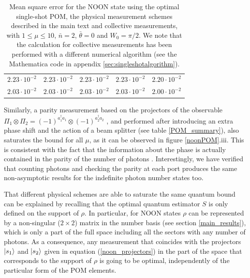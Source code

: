 \begin{table} [t]
{\begin{tabular}{|c|c|c|c|c|}
$2.23\cdot 10^{-2}$ & $2.23\cdot 10^{-2}$ & $2.23\cdot 10^{-2}$ & $2.23\cdot 10^{-2}$ & $2.20\cdot 10^{-2}$ \\
$2.03\cdot 10^{-2}$ & $2.03\cdot 10^{-2}$ & $2.03\cdot 10^{-2}$ & $2.03\cdot 10^{-2}$ & $2.00\cdot 10^{-2}$ \\ 
\hline
\end{tabular}}
\caption[Numerical results for NOON states]{Mean square error for the NOON state using the optimal single-shot POM, the physical measurement schemes described in the main text and collective measurements, with $1\leqslant\mu\leqslant 10$, $\bar{n}=2$, $\bar{\theta}=0$ and $W_0=\pi/2$. We note that the calculation for collective measurements has been performed with a different numerical algorithm (see the Mathematica code in appendix \ref{sec:singleshotalgorithm}).}
\label{noon_POM_summary}
\end{table}

Similarly, a parity measurement based on the projectors of the observable $\Pi_1\otimes \Pi_2 =  (-1)^{a_1^{\dagger}a_1}\otimes (-1)^{a_2^{\dagger}a_2}$ \cite{gerry2010, chiruvelli2011}, and performed after introducing an extra phase shift and the action of a beam splitter (see table \ref{POM_summary}), also saturates the bound for all $\mu$, as it can be observed in figure \ref{noonPOM}.iii. This is consistent with the fact that the information about the phase is actually contained in the parity of the number of photons \cite{kolodynski2014, gerry2010, chiruvelli2011}. Interestingly, we have verified that counting photons and checking the parity at each port produces the same non-asymptotic results for the indefinite photon number states too. 

That different physical schemes are able to saturate the same quantum bound can be explained by recalling that the optimal quantum estimator $S$ is only defined on the support of $\rho$. In particular, for NOON states $\rho$ can be represented by a non-singular ($2 \times 2$) matrix in the number basis (see section \ref{main_results}), which is only a part of the full space including all the sectors with any number of photons. As a consequence, any measurement that coincides with the projectors $\ket{s_1}$ and $\ket{s_2}$ given in equation (\ref{noon_projectors}) in the part of the space that corresponds to the support of $\rho$ is going to be optimal, independently of the particular form of the POM elements. 

